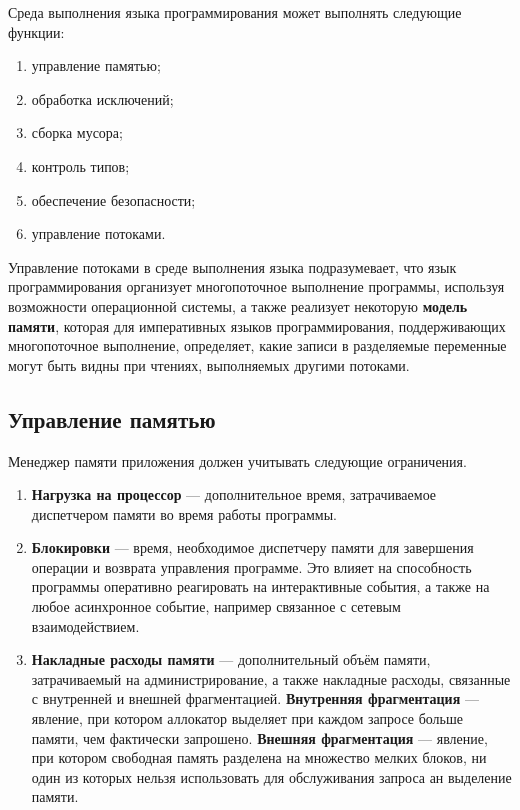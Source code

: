 Среда выполнения языка программирования может выполнять следующие функции: \cite{dotnet_clr}

\begin{enumerate}[label*=\arabic*)]
	\item управление памятью;
	\item обработка исключений; 
	\item сборка мусора; 
	\item контроль типов;
	\item обеспечение безопасности; 
	\item управление потоками. 
\end{enumerate}

Управление потоками в среде выполнения языка подразумевает, что язык программирования организует многопоточное выполнение программы, используя возможности операционной системы, а также реализует некоторую \textbf{модель памяти}, которая для императивных языков программирования, поддерживающих многопоточное выполнение, определяет, какие записи в разделяемые переменные могут быть видны при чтениях, выполняемых другими потоками. \cite{memory_model}

\subsection{Управление памятью}
\label{memory_management}

Менеджер памяти приложения должен учитывать следующие ограничения. \cite{mm_overview}

\begin{enumerate}[label*=\arabic*.]
	\item \textbf{Нагрузка на процессор} --- дополнительное время, затрачиваемое диспетчером памяти во время работы программы.
	\item \textbf{Блокировки} --- время, необходимое диспетчеру памяти для завершения операции и возврата управления программе. Это влияет на способность программы оперативно реагировать на интерактивные события, а также на любое асинхронное событие, например связанное с сетевым взаимодействием.
	\item \textbf{Накладные расходы памяти} --- дополнительный объём памяти, затрачиваемый на администрирование, а также накладные расходы, связанные с внутренней и внешней фрагментацией. \textbf{Внутренняя фрагментация} \cite{glossary} --- явление, при котором аллокатор выделяет при каждом запросе больше памяти, чем фактически запрошено. \textbf{Внешняя фрагментация} \cite{glossary} --- явление, при котором свободная память разделена на множество мелких блоков, ни один из которых нельзя использовать для обслуживания запроса ан выделение памяти.
\end{enumerate}

